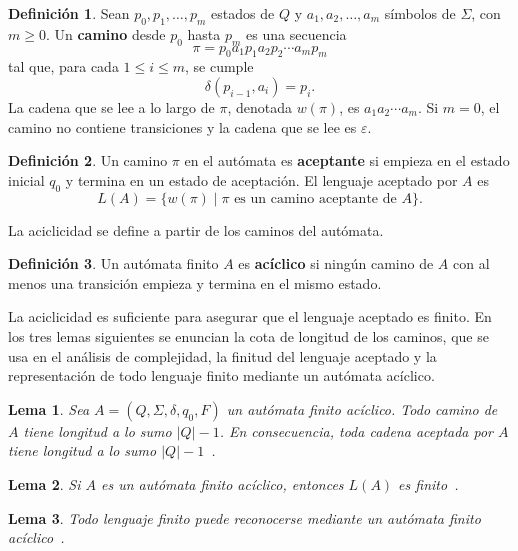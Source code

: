 \documentclass{report}
\theoremstyle{definition}
\newtheorem{definicion}{Definición}[chapter]
\theoremstyle{plain}
\newtheorem{lema}{Lema}[chapter]
\theoremstyle{remark}
\begin{document}
\begin{definicion}
Sean $p_0,p_1,\ldots,p_m$ estados de $Q$ y $a_1,a_2,\ldots,a_m$
símbolos de $\Sigma$, con $m \ge 0$. Un \textbf{camino} desde $p_0$
hasta $p_m$ es una secuencia
\[
  \pi = p_0 a_1 p_1 a_2 p_2 \cdots a_m p_m
\]
tal que, para cada $1 \le i \le m$, se cumple
\[
  \delta(p_{i-1},a_i)=p_i.
\]
La cadena que se lee a lo largo de $\pi$, denotada $w(\pi)$, es
$a_1a_2\cdots a_m$. Si $m=0$, el camino no contiene transiciones y la
cadena que se lee es $\varepsilon$.
\end{definicion}

\begin{definicion}
Un camino $\pi$ en el autómata es \textbf{aceptante} si empieza en el
estado inicial $q_0$ y termina en un estado de aceptación. El lenguaje
aceptado por $A$ es
\[
  L(A) =
  \{w(\pi) \mid \pi
  \text{ es un camino aceptante de } A\}.
\]
\end{definicion}

La aciclicidad se define a partir de los caminos del autómata.

\begin{definicion}
Un autómata finito $A$ es \textbf{acíclico} si
ningún camino de $A$ con al menos una transición empieza y termina en
el mismo estado.
\end{definicion}

La aciclicidad es suficiente para asegurar que el lenguaje aceptado es
finito. En los tres lemas siguientes se enuncian la cota de longitud de
los caminos, que se usa en el análisis de complejidad, la finitud del
lenguaje aceptado y la representación de todo lenguaje finito mediante
un autómata acíclico.

\begin{lema}
\label{lema:longitud-caminos-aciclicos}
Sea $A=(Q,\Sigma,\delta,q_0,F)$ un autómata finito acíclico. Todo
camino de $A$ tiene longitud a lo sumo $|Q|-1$. En
consecuencia, toda cadena aceptada por $A$ tiene longitud a lo sumo
$|Q|-1$~\cite{bertsch2001rcg}.
\end{lema}

\begin{lema}
\label{lema:lenguaje-finito-aciclico}
Si $A$ es un autómata finito acíclico, entonces
$L(A)$ es finito~\cite{bertsch2001rcg}.
\end{lema}

\begin{lema}
\label{lema:finito-reconocible-aciclico}
Todo lenguaje finito puede reconocerse mediante un autómata finito
acíclico~\cite{bertsch2001rcg}.
\end{lema}
\end{document}
